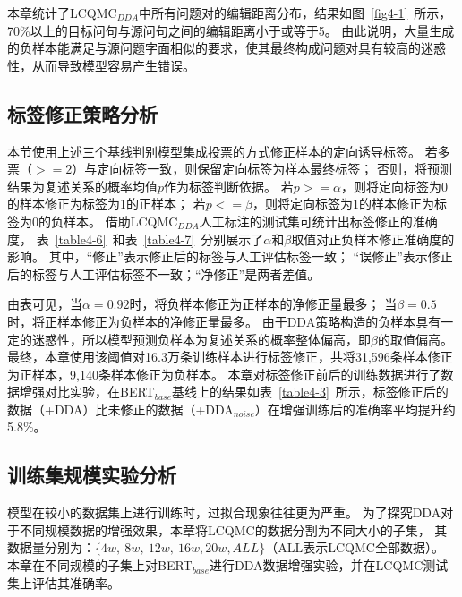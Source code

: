 

本章统计了LCQMC$_{DDA}$中所有问题对的编辑距离分布，结果如图~\ref{fig4-1}~所示，70\%以上的目标问句与源问句之间的编辑距离小于或等于5。
由此说明，大量生成的负样本能满足与源问题字面相似的要求，使其最终构成问题对具有较高的迷惑性，从而导致模型容易产生错误。



\subsection{标签修正策略分析}\label{4.3.3 标签修正策略分析}

本节使用上述三个基线判别模型集成投票的方式修正样本的定向诱导标签。
若多票（$>=2$）与定向标签一致，则保留定向标签为样本最终标签；
否则，将预测结果为复述关系的概率均值$p$作为标签判断依据。
若$p>=\alpha$，则将定向标签为0的样本修正为标签为1的正样本；
若$p<=\beta$，则将定向标签为1的样本修正为标签为0的负样本。
借助LCQMC$_{DDA}$人工标注的测试集可统计出标签修正的准确度，
表~\ref{table4-6}~和表~\ref{table4-7}~分别展示了$\alpha$和$\beta$取值对正负样本修正准确度的影响。
其中，“修正”表示修正后的标签与人工评估标签一致；
“误修正”表示修正后的标签与人工评估标签不一致；“净修正”是两者差值。



由表可见，当$\alpha=0.92$时，将负样本修正为正样本的净修正量最多；
当$\beta=0.5$时，将正样本修正为负样本的净修正量最多。
由于DDA策略构造的负样本具有一定的迷惑性，所以模型预测负样本为复述关系的概率整体偏高，即$\beta$的取值偏高。
最终，本章使用该阈值对16.3万条训练样本进行标签修正，共将31,596条样本修正为正样本，9,140条样本修正为负样本。
本章对标签修正前后的训练数据进行了数据增强对比实验，在BERT$_{base}$基线上的结果如表~\ref{table4-3}~所示，标签修正后的数据（+DDA）比未修正的数据（+DDA$_{noise}$）在增强训练后的准确率平均提升约5.8\%。



\subsection{训练集规模实验分析}

模型在较小的数据集上进行训练时，过拟合现象往往更为严重。
为了探究DDA对于不同规模数据的增强效果，本章将LCQMC的数据分割为不同大小的子集，
其数据量分别为：$\{4w,\ 8w,\ 12w,\ 16w,20w,ALL\}$（ALL表示LCQMC全部数据）。
本章在不同规模的子集上对BERT$_{base}$进行DDA数据增强实验，并在LCQMC测试集上评估其准确率。



